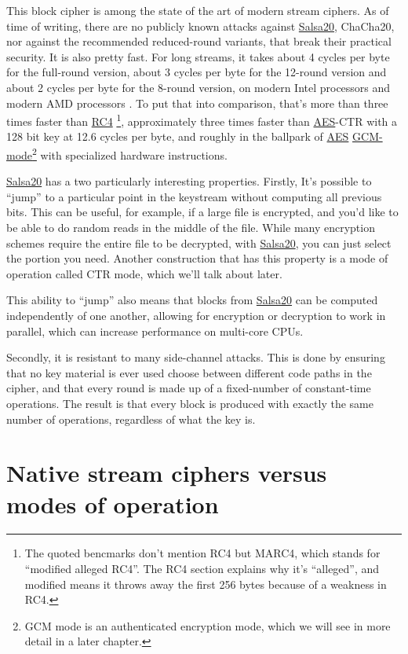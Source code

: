 \documentclass[11pt,ebook,table,dvipsnames]{memoir}
\begin{document}
This block cipher is among the state of the art of modern stream
ciphers. As of time of writing, there are no publicly known attacks
against \hyperref[Salsa20]{Salsa20}, ChaCha20, nor against the recommended reduced-round
variants, that break their practical security. It is also pretty fast.
For long streams, it takes about 4 cycles per byte for the full-round
version, about 3 cycles per byte for the 12-round version and about 2
cycles per byte for the 8-round version, on modern Intel processors
\cite{salsa20:speed} and modern AMD processors \cite{cryptopp:bench}.
To put that into comparison, that's more than three times faster than
\hyperref[RC4]{RC4} \footnote{The quoted bencmarks don't mention RC4 but MARC4, which
stands for \enquote{modified alleged RC4}. The RC4 section explains why it's
\enquote{alleged}, and modified means it throws away the first 256 bytes
because of a weakness in RC4.}, approximately three times faster than
\hyperref[AES]{AES}-CTR with a 128 bit key at 12.6 cycles per byte, and roughly in the
ballpark of \hyperref[AES]{AES} \hyperref[GCM mode]{GCM-mode}\footnote{GCM mode is an authenticated encryption
mode, which we will see in more detail in a later chapter.} with
specialized hardware instructions.

\label{keystream-jump}
\hyperref[Salsa20]{Salsa20} has a two particularly interesting properties. Firstly, It's
possible to \enquote{jump} to a particular point in the keystream without
computing all previous bits. This can be useful, for example, if a
large file is encrypted, and you'd like to be able to do random reads
in the middle of the file. While many encryption schemes require the
entire file to be decrypted, with \hyperref[Salsa20]{Salsa20}, you can just select the
portion you need. Another construction that has this property is a
mode of operation called \gls{CTR mode}, which we'll talk about later.

This ability to \enquote{jump} also means that blocks from \hyperref[Salsa20]{Salsa20} can be
computed independently of one another, allowing for encryption or
decryption to work in parallel, which can increase performance on
multi-core CPUs.

Secondly, it is resistant to many side-channel attacks. This is
done by ensuring that no key material is ever used choose between
different code paths in the cipher, and that every round is made up
of a fixed-number of constant-time operations. The result is that
every block is produced with exactly the same number of operations,
regardless of what the key is.
\section{Native stream ciphers versus modes of operation}
\label{sec-2-3-13}
\end{document}
